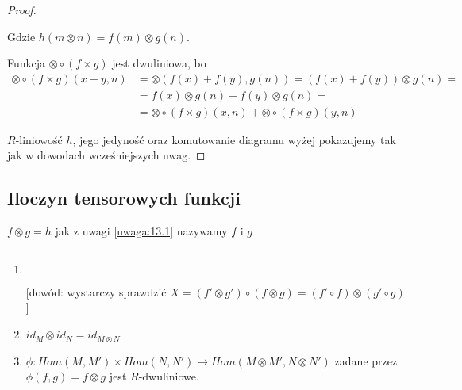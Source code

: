 \begin{proof}$ $\newline

  \begin{center}\end{center}

  Gdzie $h(m\otimes n)=f(m)\otimes g(n)$.

  Funkcja $\otimes\circ(f\times g)$ jest dwuliniowa, bo
  \begin{align*}
    \otimes\circ(f\times g)(x+y, n)&=\otimes(f(x)+f(y), g(n))=(f(x)+f(y))\otimes g(n)=\\
                                   &=f(x)\otimes g(n)+f(y)\otimes g(n)=\\
                                   &=\otimes\circ(f\times g)(x, n)+\otimes\circ(f\times g)(y, n)
  \end{align*}

  $R$-liniowość $h$, jego jedyność oraz komutowanie diagramu wyżej pokazujemy tak jak w dowodach wcześniejszych uwag.
\end{proof}

\subsection{Iloczyn tensorowych funkcji}

\begin{definition} $f\otimes g=h$ jak z uwagi \ref{uwaga:13.1} nazywamy  $f$ i $g$
\end{definition}

\begin{remark}$ $\newline
  \begin{enumerate}
    \item $ $\newline {}
      [dowód: wystarczy sprawdzić $X=(f'\otimes g')\circ(f\otimes g)=(f'\circ f)\otimes (g'\circ g)$]
    \item $id_M\otimes id_N=id_{M\otimes N}$
    \item $\phi:Hom(M, M')\times Hom(N, N')\to Hom(M\otimes M', N\otimes N')$ zadane przez $\phi(f, g)=f\otimes g$ jest $R$-dwuliniowe.
  \end{enumerate}
\end{remark}


